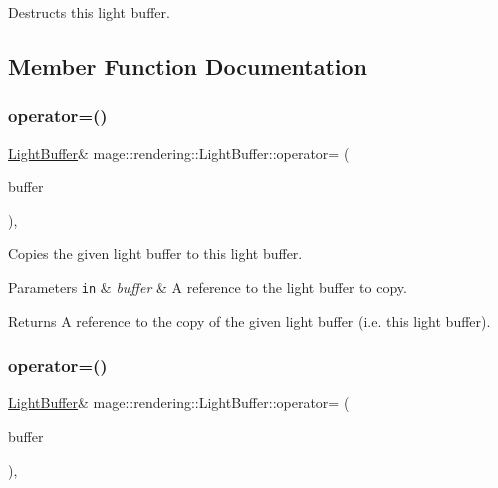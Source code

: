 Destructs this light buffer. 

\subsection{Member Function Documentation}
\hypertarget{structmage_1_1rendering_1_1_light_buffer_a409af50e3d21571e56b36c6c88769a65}{}\label{structmage_1_1rendering_1_1_light_buffer_a409af50e3d21571e56b36c6c88769a65} 
\subsubsection{\texorpdfstring{operator=()}{operator=()}\hspace{0.1cm}{\footnotesize\ttfamily [1/2]}}
{\footnotesize\ttfamily \hyperlink{structmage_1_1rendering_1_1_light_buffer}{Light\+Buffer}\& mage\+::rendering\+::\+Light\+Buffer\+::operator= (\begin{DoxyParamCaption}\item[{const \hyperlink{structmage_1_1rendering_1_1_light_buffer}{Light\+Buffer} \&}]{buffer }\end{DoxyParamCaption})\hspace{0.3cm}{\ttfamily [default]}, {\ttfamily [noexcept]}}

Copies the given light buffer to this light buffer.


\begin{DoxyParams}[1]{Parameters}
\mbox{\tt in}  & {\em buffer} & A reference to the light buffer to copy. \\
\hline
\end{DoxyParams}
\begin{DoxyReturn}{Returns}
A reference to the copy of the given light buffer (i.\+e. this light buffer). 
\end{DoxyReturn}
\hypertarget{structmage_1_1rendering_1_1_light_buffer_abe8ee3df1e5c2ce28aaab03ce729a184}{}\label{structmage_1_1rendering_1_1_light_buffer_abe8ee3df1e5c2ce28aaab03ce729a184} 
\subsubsection{\texorpdfstring{operator=()}{operator=()}\hspace{0.1cm}{\footnotesize\ttfamily [2/2]}}
{\footnotesize\ttfamily \hyperlink{structmage_1_1rendering_1_1_light_buffer}{Light\+Buffer}\& mage\+::rendering\+::\+Light\+Buffer\+::operator= (\begin{DoxyParamCaption}\item[{\hyperlink{structmage_1_1rendering_1_1_light_buffer}{Light\+Buffer} \&\&}]{buffer }\end{DoxyParamCaption})\hspace{0.3cm}{\ttfamily [default]}, {\ttfamily [noexcept]}}

